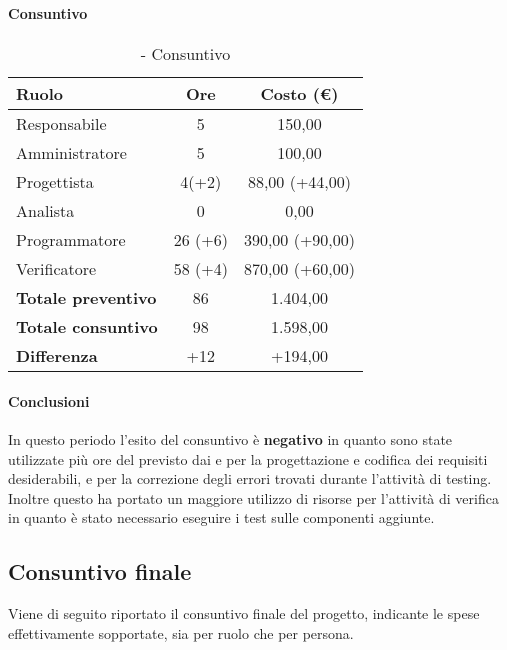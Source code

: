 \documentclass[./PianoDiProgetto.tex]{subfiles}
\begin{document}
\subsubsection{\PerV}

\paragraph{Consuntivo}
\begin{table}[H]
		\centering

		\begin{tabular}{l * {2}{c}}
			\toprule
			\textbf{Ruolo} & \textbf{Ore} & \textbf{Costo (\euro{})} \\
			\midrule
			Responsabile & 5 & 150,00 \\
			Amministratore  & 5 & 100,00 \\
			Progettista  & 4(+2) & 88,00 (+44,00) \\
			Analista & 0 & 0,00 \\
			Programmatore  & 26 (+6) &  390,00 (+90,00) \\
			Verificatore  & 58 (+4)  &  870,00 (+60,00)  \\
			\midrule
			\textbf{Totale preventivo}  & 86   &  1.404,00\\
			\textbf{Totale consuntivo}  & 98   &  1.598,00 \\
			\midrule
			\textbf{Differenza}  & +12  &  +194,00 \\
			\bottomrule
		\end{tabular}
		\caption{\PerV{} - Consuntivo}
	\end{table}
\paragraph{Conclusioni}	
In questo periodo l'esito del consuntivo è \textbf{negativo} in quanto sono state utilizzate più ore del previsto dai \PJP{} e \PRP{} per la progettazione e codifica dei requisiti desiderabili, e per la correzione degli errori trovati durante l'attività di testing. Inoltre questo ha portato un maggiore utilizzo di risorse per l'attività di verifica in quanto è stato necessario eseguire i test sulle componenti aggiunte.
\clearpage

\subsection{Consuntivo finale}
Viene di seguito riportato il consuntivo finale del progetto, indicante le spese effettivamente sopportate, sia per ruolo che per persona.
\end{document}
